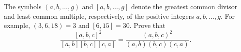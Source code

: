 The symbols $ (a,b,\ldots,g)$ and $ [a,b,\ldots,g]$ denote the greatest common divisor and least common multiple, respectively, of the positive integers $ a,b,\ldots,g$. For example, $ (3,6,18)=3$ and $ [6,15]=30$. Prove that \[ \frac{[a,b,c]^2}{[a,b][b,c][c,a]}=\frac{(a,b,c)^2}{(a,b)(b,c)(c,a)}.\]